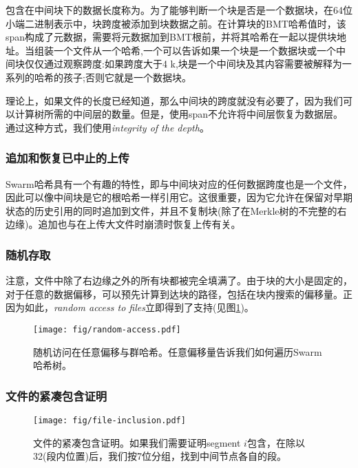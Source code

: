 包含在中间块下的数据长度称为。为了能够判断一个块是否是一个数据块，在64位小端二进制表示中，块跨度被添加到块数据之前。在计算块的BMT哈希值时，该span构成了元数据，需要将元数据加到BMT根前，并将其哈希在一起以提供块地址。当组装一个文件从一个哈希,一个可以告诉如果一个块是一个数据块或一个中间块仅仅通过观察跨度:如果跨度大于4 k,块是一个中间块及其内容需要被解释为一系列的哈希的孩子;否则它就是一个数据块。

理论上，如果文件的长度已经知道，那么中间块的跨度就没有必要了，因为我们可以计算树所需的中间层的数量。但是，使用span不允许将中间层恢复为数据层。通过这种方式，我们使用\emph{integrity of the depth}。 

\subsubsection{追加和恢复已中止的上传}

Swarm哈希具有一个有趣的特性，即与中间块对应的任何数据跨度也是一个文件，因此可以像中间块是它的根哈希一样引用它。这很重要，因为它允许在保留对早期状态的历史引用的同时追加到文件，并且不复制块(除了在Merkle树的不完整的右边缘)。追加也与在上传大文件时崩溃时恢复上传有关。

\subsubsection{随机存取}

注意，文件中除了右边缘之外的所有块都被完全填满了。由于块的大小是固定的，对于任意的数据偏移，可以预先计算到达块的路径，包括在块内搜索的偏移量。正因为如此，\emph{random access to files}立即得到了支持(见图\ref{fig:random-access})。


\begin{figure}[htbp]
\centering
\texttt{[image: fig/random-access.pdf]}
\caption[随机访问在任意偏移量与群哈希\statusgreen]{随机访问在任意偏移与群哈希。任意偏移量告诉我们如何遍历Swarm哈希树。}
\label{fig:random-access}
\end{figure}

\subsubsection{文件的紧凑包含证明}


\begin{figure}[htbp]
\centering
\texttt{[image: fig/file-inclusion.pdf]}
\caption[压缩包含证明文件\statusgreen]{文件的紧凑包含证明。如果我们需要证明segment $i$包含，在除以32(段内位置)后，我们按7位分组，找到中间节点各自的段。}
\label{fig:file-inclusion}
\end{figure}


